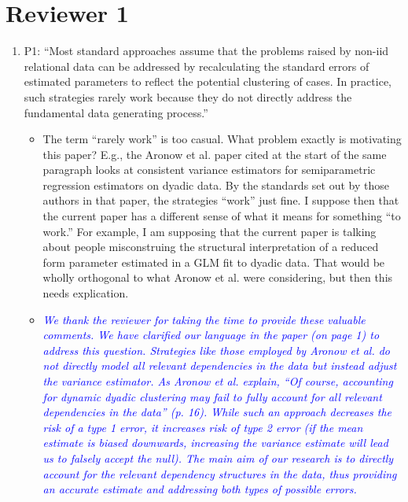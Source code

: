 \section*{Reviewer 1}

\begin{enumerate}
	\item P1: ``Most standard approaches assume that the problems raised by non-iid relational data can be addressed by recalculating the standard errors of estimated parameters to reflect the potential clustering of cases. In practice, such strategies rarely work because they do not directly address the fundamental data generating process.''
	\begin{itemize}
		\item The term “rarely work” is too casual.  What problem exactly is motivating this paper?  E.g., the Aronow et al. paper cited at the start of the same paragraph looks at consistent variance estimators for semiparametric regression estimators on dyadic data. By the standards set out by those authors in that paper, the strategies “work” just fine.  I suppose then that the current paper has a different sense of what it means for something “to work.” For example, I am supposing that the current paper is talking about people misconstruing the structural interpretation of a reduced form parameter estimated in a GLM fit to dyadic data.  That would be wholly orthogonal to what Aronow et al. were considering, but then this needs explication.
	\end{itemize}
	\begin{itemize}
		\item  \emph{ \textcolor{blue}{
		We thank the reviewer for taking the time to provide these valuable comments. We have clarified our language in the paper (on page 1) to address this question.  Strategies like those employed by Aronow et al. do not directly model all relevant dependencies in the data but instead adjust the variance estimator. As Aronow et al. explain, ``Of course, accounting for dynamic dyadic clustering may fail to fully account for all relevant dependencies in the data'' (p. 16).   While such an approach decreases the risk of a type 1 error, it increases risk of type 2 error (if the mean estimate is biased downwards, increasing the variance estimate will lead us to falsely accept the null). The main aim of our research is to directly account for the relevant dependency structures in the data, thus providing an accurate estimate and addressing both types of possible errors.
		}}

\end{itemize}
\end{enumerate}
